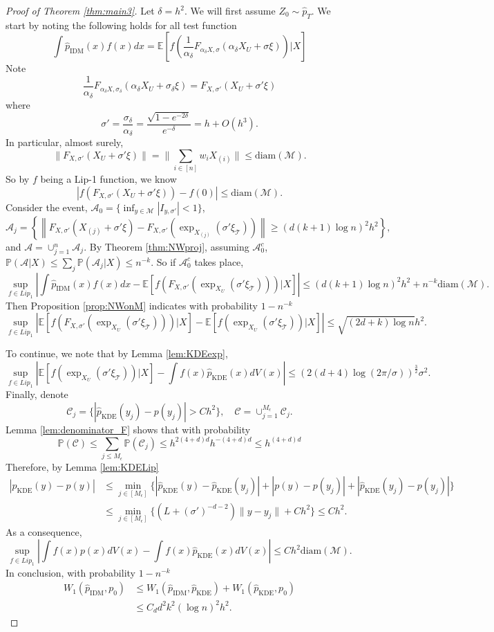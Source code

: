 \documentclass{article}
\def\Prob{{\mathbb P}}
\def\E{{\mathbb E}}
\def\phat{\hat{p}}
\def\calM{\mathcal{M}}
\begin{document}
\begin{proof}[Proof of Theorem \ref{thm:main3}]
Let $\delta=h^2$. We will first assume $Z_0\sim \phat_T$. We start by noting the following holds for all test function  
\[
\int \hat{p}_{\text{IDM}}(x)f(x)dx=\E[f(\frac{1}{\alpha_\delta}F_{\alpha_\delta X,\sigma}(\alpha_\delta X_U+\sigma \xi))|X]
\]
Note
\[
\frac{1}{\alpha_\delta}F_{\alpha_\delta X,\sigma_\delta}(\alpha_\delta X_U+\sigma_\delta \xi)=
F_{X,\sigma'}(X_U+\sigma' \xi)
\]
where
\[
\sigma'=\frac{\sigma_\delta}{\alpha_\delta}=
\frac{\sqrt{1-e^{-2\delta}}}{e^{-\delta}}=h+O(h^3).
\]
In particular, almost surely,
\[
\|F_{X,\sigma'}(X_U+\sigma' \xi)\|=
\|\sum_{i\in[n]} w_i  X_{(i)}\|\leq \text{diam}(\calM).
\]
So by $f$ being a Lip-1 function, we know 
\[
|f(F_{X,\sigma'}(X_U+\sigma' \xi))-f(0)|\leq \text{diam}(\calM).
\]
Consider the event,  $\mathcal{A}_0=\{\inf_{y\in \calM} |I_{y,\sigma'}|<1\}$, 
\[
\mathcal{A}_j=\left\{\left\| F_{X,\sigma'}(X_{(j)} + \sigma' \xi) - F_{X,\sigma'}(\exp_{X_{(j)}}(\sigma'\xi_{\mathcal{T}})) \right\| \geq  (d(k+1)\log n)^2 h^2\right\}, 
\]
and $\mathcal{A}=\cup_{j=1}^n \mathcal{A}_j$. 
By Theorem \ref{thm:NWproj}, assuming $\mathcal{A}^c_0$,
$\Prob(\mathcal{A}|X)\leq \sum_j \Prob(\mathcal{A}_j|X)\leq n^{-k}$. So if $\mathcal{A}^c_0$ takes place, 
\[
\sup_{f\in Lip_1}\left|\int \hat{p}_{\text{IDM}}(x)f(x)dx-\E[f(F_{X,\sigma'}(\exp_{X_U}(\sigma'\xi_{\mathcal{T}})) )|X]\right|\leq (d(k+1)\log n)^2h^2+n^{-k}\text{diam}(\calM).
\]
Then Proposition \ref{prop:NWonM} indicates with probability $1-n^{-k}$ 
\[
\sup_{f\in Lip_1}\left|\E[f(F_{X,\sigma'}(\exp_{X_U}(\sigma'\xi_{\mathcal{T}})))|X]-\E[f(\exp_{X_U}(\sigma'\xi_{\mathcal{T}})) |X]\right|\leq \sqrt{(2d+k)\log n}h^2. 
\]

To continue, we note that by Lemma \ref{lem:KDEexp}, 
\[
\sup_{f\in Lip_1}\left|\E[f(\exp_{X_U}(\sigma'\xi_{\mathcal{T}}))|X]-\int f(x) \widehat{p}_{\text{KDE}}(x)dV(x)\right|\leq (2(d+4)\log (2\pi/\sigma))^{\frac{3}{2}}\sigma^2.
\]
Finally, denote 
\[
\mathcal{C}_j=\{|\widehat{p}_{\text{KDE}}(y_j)-p(y_j)|>C h^2\},\quad \mathcal{C}=\cup_{j=1}^{M_\epsilon} \mathcal{C}_j.
\]
Lemma \ref{lem:denominator_F} shows that with probability $$\Prob(\mathcal{C})\leq 
\sum_{j\leq M_\epsilon}\Prob(\mathcal{C}_j)\leq h^{2(4+d)d} h^{-(4+d)d}\leq h^{(4+d)d}$$
Therefore, by Lemma \ref{lem:KDELip}
\begin{align*}
|\widehat{p}_{\text{KDE}}(y)-p(y)|&\leq \min_{j\in [M_\epsilon]}\{|\widehat{p}_{\text{KDE}}(y)-\widehat{p}_{\text{KDE}}(y_j)|+|p(y)-p(y_j)|+|\widehat{p}_{\text{KDE}}(y_j)-p(y_j)|\}\\
&\leq \min_{j\in [M_\epsilon]}\{ (L+(\sigma')^{-d-2})\|y-y_j\|+C h^2\}\leq C h^2. 
\end{align*}
As a consequence, 
\[
\sup_{f\in Lip_1}\left|\int f(x) p(x)dV(x)-\int f(x) \widehat{p}_{\text{KDE}}(x)dV(x)\right|\leq C h^2 \text{diam}(\calM). 
\]
In conclusion, with probability $1-n^{-k}$
\[  
\begin{aligned}
    W_1(\hat{p}_{\text{IDM}}, p_0)&\leq W_1(\hat{p}_{\text{IDM}}, \hat{p}_{\text{KDE}}) + W_1(\hat{p}_{\text{KDE}}, p_0)\\
    &\le C_d d^2k^2(\log n)^2 h^2.
\end{aligned}
\]


\end{proof}
\end{document}
